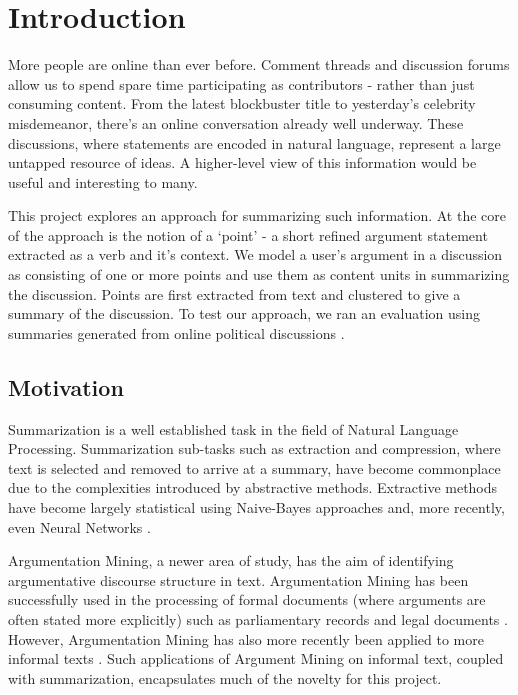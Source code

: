 \chapter{Introduction\label{chap:introduction}}
  More people are online than ever before. Comment threads and discussion forums allow us to spend spare time participating as contributors - rather than just consuming content. From the latest blockbuster title to yesterday's celebrity misdemeanor, there's an online conversation already well underway. These discussions, where statements are encoded in natural language, represent a large untapped resource of ideas. A higher-level view of this information would be useful and interesting to many.

  This project explores an approach for summarizing such information. At the core of the approach is the notion of a `point' - a short refined argument statement extracted as a verb and it's context. We model a user's argument in a discussion as consisting of one or more points and use them as content units in summarizing the discussion. Points are first extracted from text and clustered to give a summary of the discussion. To test our approach, we ran an evaluation using summaries generated from online political discussions \cite{walker2012corpus}.

  \section{Motivation}
    Summarization is a well established task in the field of Natural Language Processing. Summarization sub-tasks such as extraction and compression, where text is selected and removed to arrive at a summary, have become commonplace due to the complexities introduced by abstractive methods. Extractive methods have become largely statistical using Naive-Bayes \cite{kupiec1995trainable} approaches and, more recently, even Neural Networks \cite{svore2007enhancing}.

    Argumentation Mining, a newer area of study, has the aim of identifying argumentative discourse structure in text. Argumentation Mining has been successfully used in the processing of formal documents (where arguments are often stated more explicitly) such as parliamentary records \cite{palau2009argumentation} and legal documents \cite{montemagni2010semantic}. However, Argumentation Mining has also more recently been applied to more informal texts \cite{park2015conditional}. Such applications of Argument Mining on informal text, coupled with summarization, encapsulates much of the novelty for this project.

